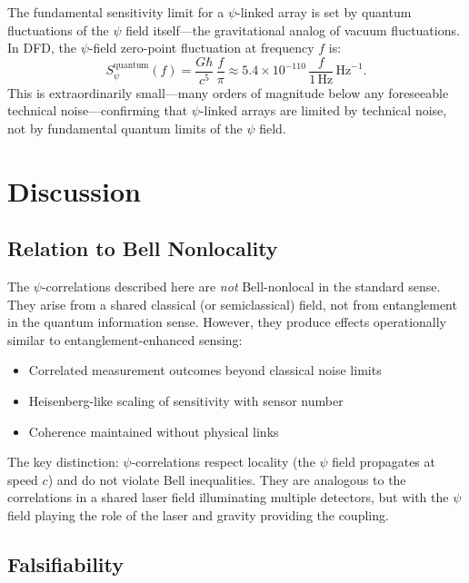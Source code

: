 \documentclass[12pt,a4paper]{article}
\theoremstyle{remark}
\begin{document}
The fundamental sensitivity limit for a $\psi$-linked array is set by
quantum fluctuations of the $\psi$ field itself---the gravitational
analog of vacuum fluctuations. In DFD, the $\psi$-field zero-point
fluctuation at frequency $f$ is:
\begin{equation}
S_\psi^{\text{quantum}}(f) = \frac{G\hbar}{c^5}\,\frac{f}{\pi}
\approx 5.4 \times 10^{-110}\,\frac{f}{1\,\text{Hz}}\,\text{Hz}^{-1}.
\label{eq:quantum-floor}
\end{equation}
This is extraordinarily small---many orders of magnitude below any
foreseeable technical noise---confirming that $\psi$-linked arrays are
limited by technical noise, not by fundamental quantum limits of the
$\psi$ field.


\section{Discussion}\label{sec:discussion}

\subsection{Relation to Bell Nonlocality}

The $\psi$-correlations described here are \emph{not} Bell-nonlocal in the
standard sense. They arise from a shared classical (or semiclassical) field,
not from entanglement in the quantum information sense. However, they
produce effects operationally similar to entanglement-enhanced sensing:
\begin{itemize}
\item Correlated measurement outcomes beyond classical noise limits
\item Heisenberg-like scaling of sensitivity with sensor number
\item Coherence maintained without physical links
\end{itemize}

The key distinction: $\psi$-correlations respect locality (the $\psi$ field
propagates at speed $c$) and do not violate Bell inequalities. They are
analogous to the correlations in a shared laser field illuminating multiple
detectors, but with the $\psi$ field playing the role of the laser and
gravity providing the coupling.

\subsection{Falsifiability}
\end{document}
